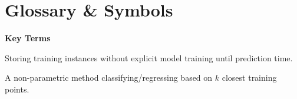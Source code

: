 \documentclass[a4paper,11pt]{article}
\begin{document}
\section*{Glossary \& Symbols}
\noindent\textbf{Key Terms}
\begin{description}[leftmargin=8.5em,style=nextline,font=\normalfont\bfseries\color{navy}]
  \item[Lazy Learning] Storing training instances without explicit model training until prediction time.
  \item[k-Nearest Neighbors] A non-parametric method classifying/regressing based on $k$ closest training points.
\end{description}
\end{document}
